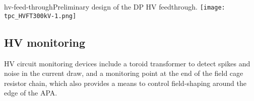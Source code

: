 \begin{cdrfigure}[HV feedthrough]{hv-feed-through}{Preliminary design of the DP HV feedthrough.}
\texttt{[image: tpc\_HVFT300kV-1.png]}
\end{cdrfigure}




\subsection{HV monitoring}

HV circuit monitoring devices include a toroid transformer to detect
spikes and noise in the current draw, and a monitoring point at the end
of the field cage resistor chain, which also provides a means to
control field-shaping around the edge of the
APA.


